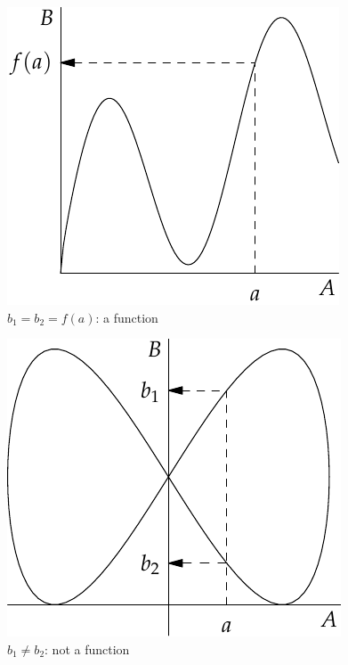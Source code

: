 \begin{center}
\begin{minipage}{0.32\textwidth}\centering
\includegraphics[width=\textwidth]{relations-05-funcvert}\\
$b_1=b_2=f(a)$: a function
\end{minipage}\qquad\qquad\qquad\qquad
\begin{minipage}{0.32\textwidth}\centering
\includegraphics[width=\textwidth]{relations-06-funcvert}\\
$b_1\neq b_2$: not a function
\end{minipage}
\end{center}

